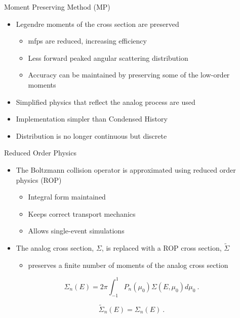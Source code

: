 \documentclass{beamer}
\begin{document}

\begin{frame}{Moment Preserving Method (MP)}

  \begin{itemize}
\item Legendre moments of the cross section are preserved
  
  \begin{itemize}
    \item mfps are reduced, increasing efficiency
    \item Less forward peaked angular scattering distribution
    \item Accuracy can be maintained by preserving some of the low-order moments
  \end{itemize}

\item Simplified physics that reflect the analog process are used

\item Implementation simpler than Condensed History

\item Distribution is no longer continuous but discrete
  \end{itemize}

\end{frame}


\begin{frame}{Reduced Order Physics}

\begin{itemize}
 \item The Boltzmann collision operator is approximated using reduced order physics (ROP)
  
  \begin{itemize}
    \item Integral form maintained
    \item Keeps correct transport mechanics
    \item Allows single-event simulations
  \end{itemize}

 \item The analog cross section, $ \Sigma $, is replaced with a ROP cross section, $ \tilde{\Sigma} $
  \begin{itemize}
    \item  preserves a finite number of moments of the analog cross section
  \end{itemize}
  
\end{itemize}

	\begin{equation}
		\Sigma_n(E) = 2\pi \int_{-1}^{1}P_n(\mu_0)\Sigma(E,\mu_0)d\mu_0~.
	\end{equation}
	
	\begin{equation}
		\tilde{\Sigma}_n(E) = \Sigma_n(E)~.
	\end{equation}

\end{frame}
\end{document}
